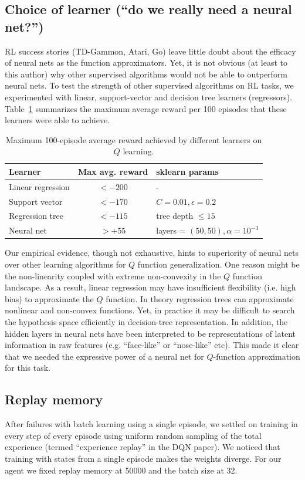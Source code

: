 \documentclass[conference]{IEEEtran}
\begin{document}
\subsection{Choice of learner (``do we really need a neural net?'')}\label{sec:expts1}
RL success stories (TD-Gammon, Atari, Go) leave little doubt about the efficacy of neural nets as the function approximators. Yet, it is not obvious (at least to this author) why other supervised algorithms would not be able to outperform neural nets. To test the strength of other supervised algorithms on RL tasks, we experimented with linear, support-vector and decision tree learners (regressors). Table~\ref{tab:learners} summarizes the maximum average reward per 100 episodes that these learners were able to achieve. 
\begin{table}[bpht]
\begin{center}
\begin{tabular}{|l|c|l|}
\hline
Learner & Max avg. reward & sklearn params \\ \hline 
Linear regression & $<-200$ & -\\
Support vector & $<-170$ & $C=0.01, \epsilon=0.2$ \\
Regression tree &$<-115$ & tree depth $\leq 15$ \\
Neural net & $> +55 $ & layers = $(50, 50), \alpha =10^{-3} $ \\ \hline
\end{tabular}
\end{center}
\caption{Maximum 100-episode average reward achieved by different learners on $Q$ learning. \label{tab:learners}}
\end{table}

Our empirical evidence, though not exhaustive, hints to superiority of neural nets over other learning algorithms for $Q$ function generalization. One reason might be the non-linearity coupled with extreme non-convexity in the $Q$ function landscape. As a result, linear regression may have insufficient flexibility (i.e. high bias) to approximate the $Q$ function. In theory regression trees can approximate nonlinear and non-convex functions. Yet, in practice it may be difficult to search the hypothesis space efficiently in decision-tree representation. In addition, the hidden layers in neural nets have been interpreted to be representations of latent information in raw features (e.g. ``face-like'' or ``nose-like'' etc). This made it clear that we needed the expressive power of a neural net for $Q$-function approximation for this task.
\subsection{Replay memory}
After failures with batch learning using a single episode, we settled on training in every step of every episode using uniform random sampling of the total experience (termed ``experience replay'' in the DQN paper). We noticed that training with states from a single episode makes the weights diverge. For our agent we fixed replay memory at 50000 and the batch size at 32.
\end{document}
